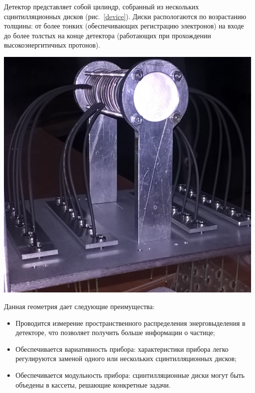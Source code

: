 \documentclass[a1paper,portrait, fontscale=0.575]{baposter}
\begin{document}
\begin{poster}
{            Детектор представляет собой цилиндр, собранный из нескольких сцинтилляционных дисков (рис.~\ref{device}). Диски распологаются по возрастанию толщины: от более тонких (обеспечивающих регистрацию электронов) на входе до более толстых на конце детектора (работающих при прохождении высокоэнергитичных протонов). 
            
            \begin{center}
                \includegraphics[width=0.9\linewidth]{detector.png}
                \label{device}
            \end{center}   
            Данная геометрия дает следующие преимущества:
            \begin{itemize}
                \item Проводится измерение пространственного распределения энерговыделения в детекторе, что позволяет получить больше информации о частице;
                \item Обеспечивается вариативность прибора: характеристики прибора легко регулируются заменой одного или нескольких сцинтилляционных дисков;
                \item Обеспечивается модульность прибора: сцинтилляционные диски могут быть объедены в кассеты, решающие конкретные задачи.
            \end{itemize}  
            
}
\end{poster}
\end{document}
